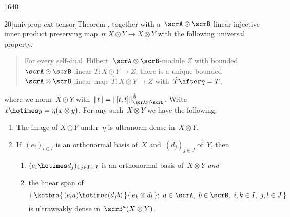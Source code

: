 \begin{parsec}{1640}
\begin{point}{20}[univprop-ext-tensor]{Theorem}
    ,
    together with a~$\scrA \odot \scrB$-linear injective
    inner product preserving map~$\eta \colon X \odot Y \to X\otimes Y$
    with the following universal property.
    \begin{quote}
    For every self-dual~Hilbert~$\scrA\otimes\scrB$-module
    $Z$ with bounded~$\scrA \odot \scrB$-linear
        $T\colon X \odot Y \to Z$,
    there is a unique bounded~$\scrA \otimes \scrB$-linear
        map~$\hat{T}\colon X \otimes Y \to Z$
    with~$\hat{T} \after \eta= T$,
    \end{quote}
where we norm~$X \odot Y$ with~$\|t \| = \|[t,t]\|^{\frac{1}{2}}_{\scrA\otimes \scrB}$.
Write~$x \hotimes y = \eta(x\otimes y)$.
For any such~$X \otimes Y$ we have the following.
\begin{enumerate}
    \item The image of $X \odot Y$ under~$\eta$ is ultranorm dense in~$X \otimes Y$.
    \item If~$(e_i)_{i \in I}$ is an orthonormal basis of~$X$
                and~$(d_j)_{j \in J}$ of~$Y$,
                then
        \begin{enumerate}
            \item $(e_i \hotimes d_j)_{i,j\in I\times J}$
                is an orthonormal basis of~$X \otimes Y$ \emph{and}
            \item
                the linear span of
                \begin{equation*}
                    \{\, \ketbra{\,(e_i a) \hotimes (d_j b) \,}{\,
                        e_{k}\otimes d_{l} \,}; \ 
                        a \in \scrA, \ 
                        b \in \scrB,\ 
                        i,k \in I,\ 
                        j,l \in J \,
                    \} 
                \end{equation*}
                is ultraweakly dense in~$\scrB^a(X \otimes Y)$.
        \end{enumerate}
                

\end{enumerate}
\end{point}
\end{parsec}
